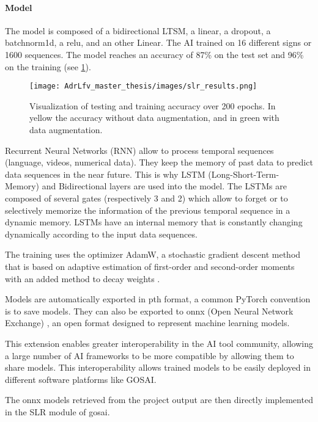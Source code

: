 \paragraph{Model}

The model is composed of a bidirectional LTSM, a linear, a dropout, a batchnorm1d, a relu, and an other Linear. The AI trained on 16 different signs or 1600 sequences. The model reaches an accuracy of 87\% on the test set and 96\% on the training (see \ref{fig:slr_results}).

\begin{figure}[h]
    \centering
    \texttt{[image: AdrLfv\_master\_thesis/images/slr\_results.png]}
    \caption{Visualization of testing and training accuracy over 200 epochs. In yellow the accuracy without data augmentation, and in green with data augmentation.}
    \label{fig:slr_results}
\end{figure}

Recurrent Neural Networks (RNN) allow to process temporal sequences (language, videos, numerical data). They keep the memory of past data to predict data sequences in the near future. 
This is why LSTM (Long-Short-Term-Memory) and Bidirectional layers are used into the model. 
The LSTMs are composed of several gates (respectively 3 and 2) which allow to forget or to selectively memorize the information of the previous temporal sequence in a dynamic memory.
LSTMs have an internal memory that is constantly changing dynamically according to the input data sequences.

The training uses the optimizer AdamW, a stochastic gradient descent method that is based on adaptive estimation of first-order and second-order moments with an added method to decay weights \cite{loshchilov2017decoupled}. 

Models are automatically exported in pth format, a common PyTorch convention is to save models. They can also be exported to onnx (Open Neural Network Exchange) \cite{onnx}, an open format designed to represent machine learning models.

This extension enables greater interoperability in the AI tool community, allowing a large number of AI frameworks to be more compatible by allowing them to share models. This interoperability allows trained models to be easily deployed in different software platforms like GOSAI.

The onnx models retrieved from the project output are then directly implemented in the SLR module of gosai.


